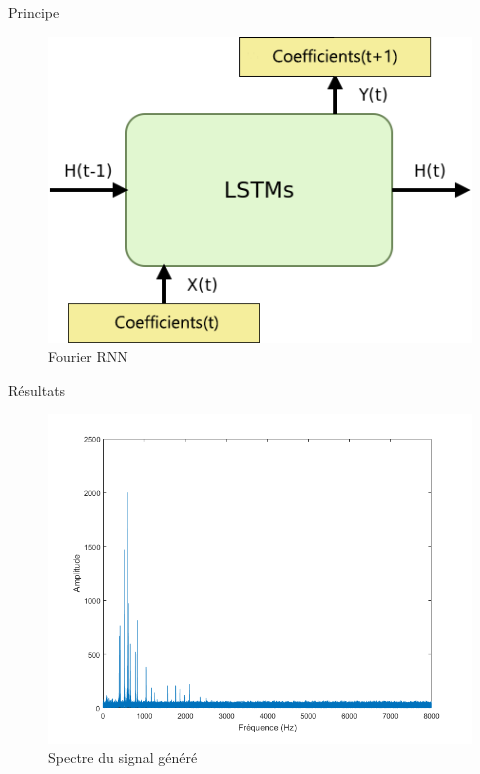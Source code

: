 \documentclass{beamer}
\begin{document}
\begin{frame}{Principe}
\begin{figure}
\begin{center}
\includegraphics[scale=0.5]{images/fourier.png}
\caption{Fourier RNN}
\end{center}
\end{figure}
\end{frame}

\begin{frame}{Résultats}
\begin{figure}
\begin{center}
\includegraphics[scale=0.4]{images/spectre.png}
\caption{Spectre du signal généré}
\end{center}
\end{figure}
\end{frame}
\end{document}
